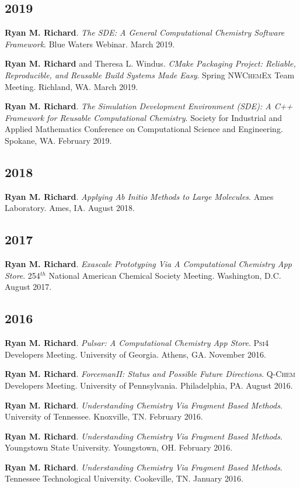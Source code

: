 \begin{etaremune}
	\subsection{2019}
	\item{\textbf{Ryan M. Richard}. \textit{The SDE: A General Computational
	      Chemistry Software Framework}. Blue Waters Webinar. March 2019.}
	\item{\textbf{Ryan M. Richard} and Theresa L. Windus. \textit{CMake
	      Packaging Project: Reliable, Reproducible, and Reusable Build Systems
		  Made Easy}. Spring \textsc{NWChemEx} Team Meeting. Richland, WA.
		  March 2019.}
	\item{\textbf{Ryan M. Richard}. \textit{The Simulation Development
	      Environment (SDE): A C++ Framework for Reusable Computational
		  Chemistry}. Society for Industrial and Applied Mathematics Conference
		  on Computational Science and Engineering. Spokane, WA. February 2019.}

	\subsection{2018}
	\item{\textbf{Ryan M. Richard}. \textit{Applying Ab Initio Methods to
	      Large Molecules}. Ames Laboratory.  Ames, IA. August 2018.}

	\subsection{2017}
	\item{\textbf{Ryan M. Richard}. \textit{Exascale Prototyping Via A
	      Computational Chemistry App Store}. 254$^{th}$ National American
		  Chemical Society Meeting.  Washington, D.C. August 2017.}

	\subsection{2016}
	\item{\textbf{Ryan M. Richard}. \textit{Pulsar: A Computational Chemistry
	      App Store}. \textsc{Psi4} Developers Meeting.  University of Georgia.
		  Athens, GA.  November 2016.}
	\item{\textbf{Ryan M. Richard}. \textit{ForcemanII: Status and Possible
	      Future Directions}.  \textsc{Q-Chem} Developers Meeting.  University
		  of Pennsylvania. Philadelphia, PA. August 2016.}
	\item{\textbf{Ryan M. Richard}. \textit{Understanding Chemistry Via Fragment
	      Based Methods}. University of Tennessee.  Knoxville, TN.  February
		  2016.}
	\item{\textbf{Ryan M. Richard}. \textit{Understanding Chemistry Via Fragment
	      Based Methods}. Youngstown State University.  Youngstown, OH.
		  February 2016.}
	\item{\textbf{Ryan M. Richard}. \textit{Understanding Chemistry Via Fragment
	      Based Methods}. Tennessee Technological University.  Cookeville, TN.
		  January 2016.}


\end{etaremune}
